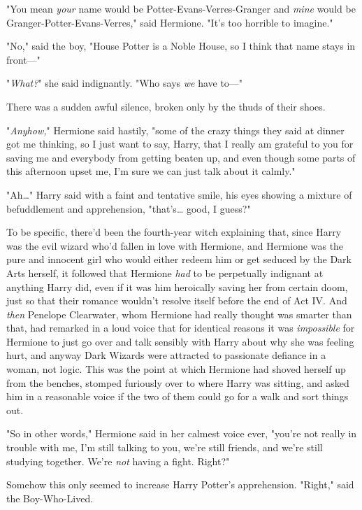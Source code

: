 "You mean \emph{your} name would be Potter-Evans-Verres-Granger and \emph{mine}
would be Granger-Potter-Evans-Verres," said Hermione. "It's too horrible to
imagine."

"No," said the boy, "House Potter is a Noble House, so I think that name stays
in front---"

"\emph{What?}" she said indignantly. "Who says \emph{we} have to---"

There was a sudden awful silence, broken only by the thuds of their shoes.

"\emph{Anyhow,}" Hermione said hastily, "some of the crazy things they said at
dinner got me thinking, so I just want to say, Harry, that I really am grateful
to you for saving me and everybody from getting beaten up, and even though some
parts of this afternoon upset me, I'm sure we can just talk about it calmly."

"Ah{\ldots}" Harry said with a faint and tentative smile, his eyes showing a
mixture of befuddlement and apprehension, "that's{\ldots} good, I guess?"

To be specific, there'd been the fourth-year witch explaining that, since Harry
was the evil wizard who'd fallen in love with Hermione, and Hermione was the
pure and innocent girl who would either redeem him or get seduced by the Dark
Arts herself, it followed that Hermione \emph{had} to be perpetually indignant
at anything Harry did, even if it was him heroically saving her from certain
doom, just so that their romance wouldn't resolve itself before the end of Act
IV. And \emph{then} Penelope Clearwater, whom Hermione had really thought was
smarter than that, had remarked in a loud voice that for identical reasons it
was \emph{impossible} for Hermione to just go over and talk sensibly with Harry
about why she was feeling hurt, and anyway Dark Wizards were attracted to
passionate defiance in a woman, not logic. This was the point at which Hermione
had shoved herself up from the benches, stomped furiously over to where Harry
was sitting, and asked him in a reasonable voice if the two of them could go
for a walk and sort things out.

"So in other words," Hermione said in her calmest voice ever, "you're not
really in trouble with me, I'm still talking to you, we're still friends, and
we're still studying together. We're \emph{not} having a fight. Right?"

Somehow this only seemed to increase Harry Potter's apprehension. "Right," said
the Boy-Who-Lived.

